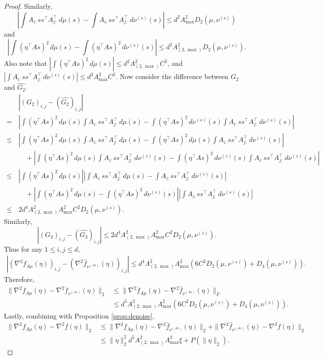 \begin{proof}
Similarly, 
\[
\left| \int A_{i:}ss^{\top}A_{j:}^{\top} \,d\mu(s) - \int A_{i:}ss^{\top}A_{j:}^{\top} \,d\nu^{(s)}(s) \right| \le d^2 A_{\max}^2 D_2(\mu,\nu^{(s)})
\]
 and 
\[
\left| \int (\eta^{\top}As)^2\,d\mu(s) -\int (\eta^{\top}As)^2\,d\nu^{(s)}(s) \right| \le d^2 A_{(2,\max)}^2 D_2(\mu,\nu^{(s)}).
\]
Also note that $ \left| \int (\eta^{\top}As)^2\,d\mu(s) \right| \le d^2A_{(2,\max)}^2 C^2$, and
$\left| \int A_{i:}ss^{\top}A_{j:}^{\top} \,d\nu^{(s)}(s) \right| \le d^2A_{\max}^2 C^2$.
Now consider the difference between $G_2$ and $\hat{G_2}$. 
\begin{align*}
& \left| (G_2)_{i,j} - (\hat{G_2})_{i,j} \right| \\
=\, & \left| \int (\eta^{\top}As)^2\,d\mu(s) \int A_{i:}ss^{\top}A_{j:}^{\top} \,d\mu(s)  - 
\int (\eta^{\top}As)^2\,d\nu^{(s)}(s) \int A_{i:}ss^{\top}A_{j:}^{\top} \,d\nu^{(s)}(s) \right| \\
\le \, & \left| \int (\eta^{\top}As)^2\,d\mu(s) \int A_{i:}ss^{\top}A_{j:}^{\top} \,d\mu(s)  - 
\int (\eta^{\top}As)^2\,d\mu(s) \int A_{i:}ss^{\top}A_{j:}^{\top} \,d\nu^{(s)}(s) \right| \\ 
& \quad + \left| \int (\eta^{\top}As)^2\,d\mu(s) \int A_{i:}ss^{\top}A_{j:}^{\top} \,d\nu^{(s)}(s)  - 
\int (\eta^{\top}As)^2\,d\nu^{(s)}(s) \int A_{i:}ss^{\top}A_{j:}^{\top} \,d\nu^{(s)}(s) \right| \\
\le\, & \left| \int (\eta^{\top}As)^2\,d\mu(s) \right| \left|\int A_{i:}ss^{\top}A_{j:}^{\top} \,d\mu(s) - \int A_{i:}ss^{\top}A_{j:}^{\top} \,d\nu^{(s)}(s) \right| \\
& \quad + \left| \int (\eta^{\top}As)^2\,d\mu(s) -\int (\eta^{\top}As)^2\,d\nu^{(s)}(s) \right| \left| \int A_{i:}ss^{\top}A_{j:}^{\top} \,d\nu^{(s)}(s) \right| \\
\le\, & 2 d^4  A_{(2,\max)}^2A_{\max}^2C^2D_2(\mu, \nu^{(s)}).
\end{align*}
Similarly,
\[
\left| (G_3)_{i,j} - (\hat{G_3})_{i,j} \right| \le 2 d^4  A_{(2,\max)}^2A_{\max}^2C^2D_2(\mu, \nu^{(s)}).
\]
Thus for any $1\le i,j\le d$,
\begin{align*}
\left|\left(\nabla^2 f_{A\mu}(\eta) \right)_{i,j} - \left(\nabla^2 \hat{f}_{\nu^{(As)}}(\eta) \right)_{i,j} \right| 
\le 
d^4  A_{(2,\max)}^2A_{\max}^2\left( 6C^2D_2(\mu, \nu^{(s)}) + D_4(\mu, \nu^{(s)})\right).
\end{align*}
Therefore, 
\begin{align*}
\|\nabla^2 f_{A\mu}(\eta) - \nabla^2 \hat{f}_{\nu^{(As)}}(\eta)  \|_2 & \le \|\nabla^2 f_{A\mu}(\eta) - \nabla^2 \hat{f}_{\nu^{(As)}}(\eta) \|_F \\
& \le d^5  A_{(2,\max)}^2A_{\max}^2\left( 6C^2D_2(\mu, \nu^{(s)}) + D_4(\mu, \nu^{(s)})\right).
\end{align*}
Lastly, combining with Proposition \ref{prop:denoise}, 
\begin{align*}
\|\nabla^2 f_{A\mu}(\eta) - \nabla^2\hat{f}(\eta)\|_2 & \le \|\nabla^2 f_{A\mu}(\eta) - \nabla^2 \hat{f}_{\nu^{(As)}}(\eta)\|_2 + \| \nabla^2 \hat{f}_{\nu^{(As)}}(\eta) - \nabla^2\hat{f}(\eta)\|_2 \\
&  \le \|\eta\|_2^2  d^5 A_{(2,\max)}^2A_{\max}^2\xi + P(\|\eta\|_2).
\end{align*}
\end{proof}
